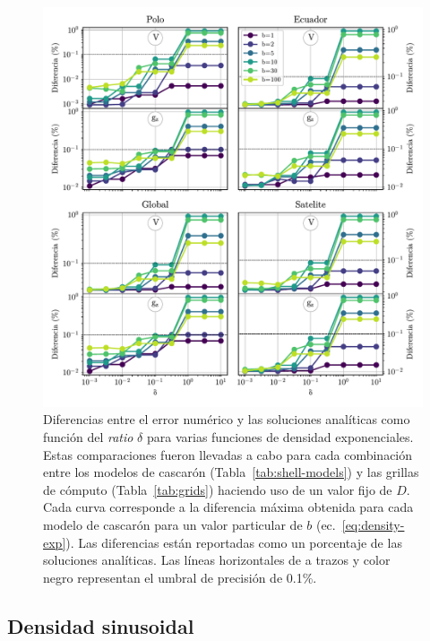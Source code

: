 \begin{figure}
\centering
\includegraphics[width=\linewidth]{figs/tesseroids-variable-density/exponential-density-diffs.pdf}
\caption{
    Diferencias entre el error numérico y las soluciones analíticas como
    función del \emph{ratio} $\delta$ para varias funciones de densidad
    exponenciales.
    Estas comparaciones fueron llevadas a cabo para cada combinación entre los
    modelos de cascarón (Tabla~\ref{tab:shell-models}) y las grillas de cómputo
    (Tabla~\ref{tab:grids}) haciendo uso de un valor fijo de $D$. Cada curva
    corresponde a la diferencia máxima obtenida para cada modelo de cascarón
    para un valor particular de $b$ (ec.~\ref{eq:density-exp}). Las diferencias
    están reportadas como un porcentaje de las soluciones analíticas. Las
    líneas horizontales de a trazos y color negro representan el umbral de
    precisión de 0.1\%.
    }
\label{fig:delta-exponential}
\end{figure}


\subsection{Densidad sinusoidal}

